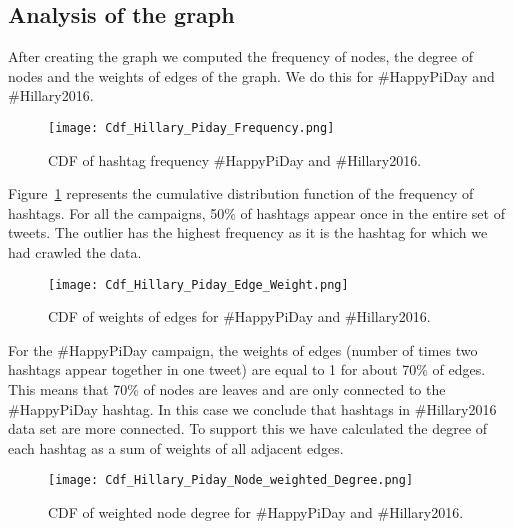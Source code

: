 \documentclass[journal, a4paper, 12pt]{article}
\begin{document}
\subsection{Analysis of the graph}

After creating the graph we computed the frequency of nodes, the degree of nodes and the weights of edges of the graph. We do this for \#HappyPiDay and \#Hillary2016.
\\

        \begin{figure}[!hbt]
            \begin{center}
            \texttt{[image: Cdf\_Hillary\_Piday\_Frequency.png]}
            \caption{CDF of hashtag frequency \#HappyPiDay and \#Hillary2016.}
            \label{fig:cdf_hillary_piday_frequency}
            \end{center}
      \end{figure}
    
Figure~\ref{fig:cdf_hillary_piday_frequency} represents the cumulative distribution function of the frequency of hashtags. For all the campaigns, 50\% of hashtags appear once in the entire set of tweets. The outlier has the highest frequency as it is the hashtag for which we had crawled the data. \\

      \begin{figure}[!hbt]
            \begin{center}
            \texttt{[image: Cdf\_Hillary\_Piday\_Edge\_Weight.png]}
            \caption{CDF of weights of edges for \#HappyPiDay and \#Hillary2016.}
            \label{fig:cdf_hillary_piday_edge_weight}
            \end{center}
      \end{figure}
    
For the \#HappyPiDay campaign, the weights of edges (number of times two hashtags appear together in one tweet) are equal to 1 for about 70\% of edges. This means that 70\% of nodes are leaves and are only connected to the \#HappyPiDay hashtag. In this case we conclude that hashtags in \#Hillary2016 data set are more connected. To support this we have calculated the degree of each hashtag as a sum of weights of all adjacent edges. \\
    
        \begin{figure}[!hbt]
            \begin{center}
            \texttt{[image: Cdf\_Hillary\_Piday\_Node\_weighted\_Degree.png]}
            \caption{CDF of weighted node degree for \#HappyPiDay and \#Hillary2016.}
            \label{fig:cdf_hillary_piday_weight_sum}
            \end{center}
      \end{figure}
\end{document}
